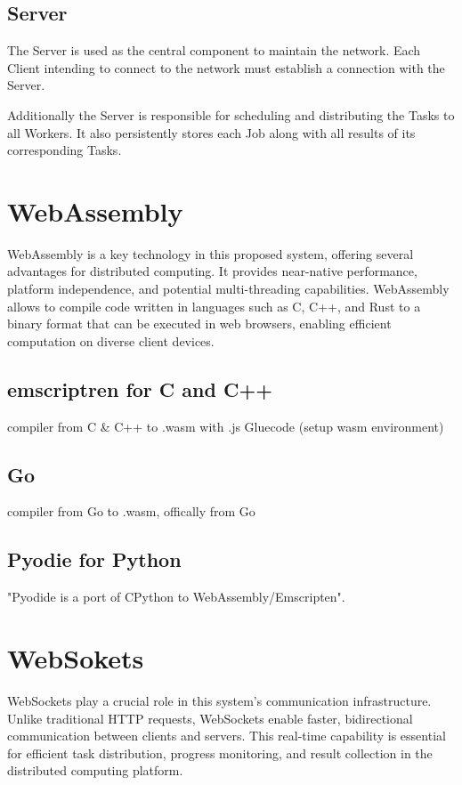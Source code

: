 \subsection{Server}
\label{subsec:methodology:entities:Server}
The Server is used as the central component to maintain the network. Each Client intending to connect to the network must establish a connection with the Server.

Additionally the Server is responsible for scheduling and distributing the Tasks to all Workers. It also persistently stores each Job along with all results of its corresponding Tasks.

\section{WebAssembly}
\label{sec:methodology:wasm}
WebAssembly is a key technology in this proposed system, offering several advantages for distributed computing. It provides near-native performance, platform independence, and potential multi-threading capabilities. WebAssembly allows to compile code written in languages such as C, C++, and Rust to a binary format that can be executed in web browsers, enabling efficient computation on diverse client devices.

\cite{methodology:wasm, methodology:wasmdocu, relatedwork:wasmedgecomputing}

\subsection{emscriptren for C and C++}
\label{subsec:methodology:wasm:cpp}
compiler from C \& C++ to .wasm with .js Gluecode (setup wasm environment) \cite{methodology:emcc}
\subsection{Go}
\label{subsec:methodology:wasm:go}
compiler from Go to .wasm, offically from Go \cite{methodology:go}
\subsection{Pyodie for Python}
\label{subsec:methodology:wasm:python}
"Pyodide is a port of CPython to WebAssembly/Emscripten". \cite{methodology:pyodie}

\section{WebSokets}
\label{sec:methodology:websokets}
WebSockets play a crucial role in this system's communication infrastructure. Unlike traditional HTTP requests, WebSockets enable faster, bidirectional communication between clients and servers. This real-time capability is essential for efficient task distribution, progress monitoring, and result collection in the distributed computing platform.


